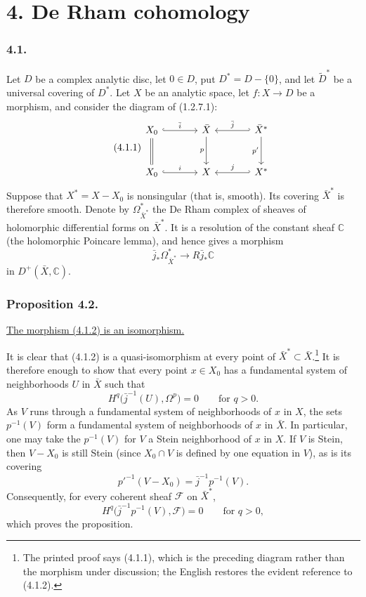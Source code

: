 \section*{4. De Rham cohomology}

\subsubsection*{4.1.}
Let $D$ be a complex analytic disc, let $0\in D$, put
$D^*=D-\{0\}$, and let $\widetilde D^*$ be a universal covering of
$D^*$.  Let $X$ be an analytic space, let
$f:X\longrightarrow D$ be a morphism, and consider the diagram of
(1.2.7.1):
\begin{equation}\tag{4.1.1}
\begin{tikzcd}[column sep=large,row sep=large]
X_0 \arrow[r,hook,"\bar i"] \arrow[d,equal]
  & \bar X \arrow[d,"p"']
  & \bar X^* \arrow[l,hook',"\bar j"'] \arrow[d,"p'"'] \\
X_0 \arrow[r,hook,"i"]
  & X
  & X^* \arrow[l,hook',"j"']
\end{tikzcd}
\end{equation}
Suppose that $X^*=X-X_0$ is nonsingular (that is, smooth).  Its
covering $\bar X^*$ is therefore smooth.  Denote by
$\Omega_{\bar X^*}^*$ the De Rham complex of sheaves of holomorphic
differential forms on $\bar X^*$.  It is a resolution of the constant
sheaf $\mathbb C$ (the holomorphic Poincare lemma), and hence gives a
morphism
\begin{equation}\tag{4.1.2}
\bar j_*\Omega_{\bar X^*}^*
\longrightarrow R\bar j_*\mathbb C
\end{equation}
in $D^+(\bar X,\mathbb C)$.

\subsubsection*{Proposition 4.2.}
\underline{The morphism (4.1.2) is an isomorphism.}

It is clear that (4.1.2) is a quasi-isomorphism at every point of
$\bar X^*\subset\bar X$.\footnote{The printed proof says (4.1.1),
which is the preceding diagram rather than the morphism under
discussion; the English restores the evident reference to (4.1.2).}
It is therefore enough to show that every point $x\in X_0$ has a
fundamental system of neighborhoods $U$ in $\bar X$ such that
\[
H^q\bigl(\bar j^{-1}(U),\Omega^p\bigr)=0
\qquad\text{for }q>0.
\]
As $V$ runs through a fundamental system of neighborhoods of $x$ in
$X$, the sets $p^{-1}(V)$ form a fundamental system of neighborhoods
of $x$ in $\bar X$.  In particular, one may take the $p^{-1}(V)$ for
$V$ a Stein neighborhood of $x$ in $X$.  If $V$ is Stein, then
$V-X_0$ is still Stein (since $X_0\cap V$ is defined by one equation
in $V$), as is its covering
\[
p'^{-1}(V-X_0)=\bar j^{-1}p^{-1}(V).
\]
Consequently, for every coherent sheaf $\mathcal F$ on $\bar X^*$,
\[
H^q\bigl(\bar j^{-1}p^{-1}(V),\mathcal F\bigr)=0
\qquad\text{for }q>0,
\]
which proves the proposition.

